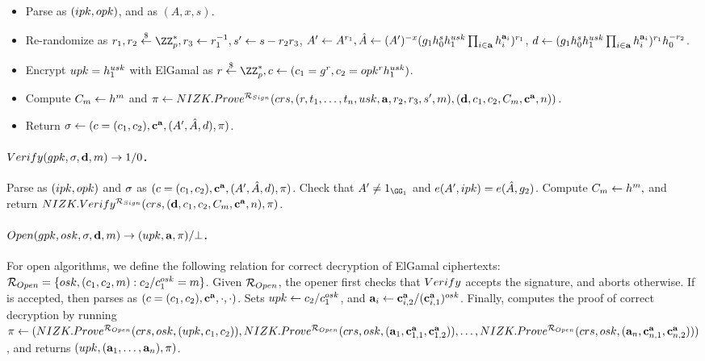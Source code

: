 \begin{itemize}
\item Parse \gpk as $(ipk,opk)$, and \cred as $(A,x,s)$.
\item Re-randomize \cred as $r_1,r_2 \getr
  \ZZ^*_p, r_3 \gets r_1^{-1}, s' \gets s - r_2r_3$, $A' \gets A^{r_1},
  \hat{A} \gets (A')^{-x}(g_1h_0^sh_1^{usk}
  \prod_{i \in \mathbf{a}}h_i^{\mathbf{a}_i})^{r_1}$,
  $d \gets (g_1h_0^sh_1^{usk}
  \prod_{i \in \mathbf{a}}h_i^{\mathbf{a}_i})^{r_1}h_0^{-r_2}$.
\item Encrypt $upk=h_1^{usk}$ with ElGamal as $r \getr \ZZ^*_p,
  c \gets (c_1 = \gen{g}^r,c_2 = \opk^r\gen{h}_1^{\usk})$.
\item Compute $C_{m} \gets h^m$ and
  $\pi \gets NIZK.Prove^{\mathcal{R}_{Sign}}(crs,
  (r,t_1,\dots,t_n,usk,\mathbf{a},r_2,r_3,s',m), (\mathbf{d},c_1,c_2,C_{m},
  \mathbf{c}^{\mathbf{a}},n))$.
\item Return $\sigma \gets (c=(c_1,c_2),\mathbf{c}^{\mathbf{a}},(A',\hat{A},d),\pi)$.
\end{itemize}

\paragraph{$Verify(gpk,\sigma,\mathbf{d},m) \rightarrow 1/0$.} %
Parse \gpk as $(ipk,opk)$ and $\sigma$ as $(c=(c_1,c_2),\mathbf{c}^{\mathbf{a}},
(A',\hat{A},d), \pi)$. Check that $A' \neq 1_{\GG_1}$ and $e(A',ipk) =
e(\hat{A},g_2)$. Compute $C_{m} \gets h^m,$ and return
$NIZK.Verify^{\mathcal{R}_{Sign}}(crs,(\mathbf{d},c_1,c_2,C_{m},\mathbf{c}^{\mathbf{a}},
n),\pi)$.

\paragraph{$Open(gpk,osk,\sigma,\mathbf{d},m)
  \rightarrow (upk,\mathbf{a},\pi)/\bot$.} %
For open algorithms, we define the following relation for correct decryption of
ElGamal ciphertexts: $\mathcal{R}_{Open} = \lbrace osk,(c_1,c_2,m):
c_2/c_1^{osk} = m \rbrace$. Given $\mathcal{R}_{Open}$, the opener first
checks that $Verify$ accepts the signature, and aborts otherwise. If \sig
is accepted, then parses \sig as $(c=(c_1,c_2),\mathbf{c}^{\mathbf{a}},\cdot,\cdot)$.
Sets $upk \gets c_2/c_1^{osk}$, and
$\mathbf{a}_i \gets \mathbf{c}^{\mathbf{a}}_{i,2}/(\mathbf{c}^{\mathbf{a}}_{i,1})^{osk}$. Finally,
computes the proof of correct decryption by running $\pi \gets
(NIZK.Prove^{\mathcal{R}_{Open}}(crs,osk,(upk,c_1,c_2)),
NIZK.Prove^{\mathcal{R}_{Open}}(crs,osk,(\mathbf{a}_1,\mathbf{c}^{\mathbf{a}}_{1,1},\mathbf{c}^{\mathbf{a}}_{1,2})),
\dots,
NIZK.Prove^{\mathcal{R}_{Open}}(crs,osk,(\mathbf{a}_n,\mathbf{c}^{\mathbf{a}}_{n,1},\mathbf{c}^{\mathbf{a}}_{n,2})))$,
and returns $(upk,(\mathbf{a}_1,\dots,\mathbf{a}_n),\pi)$.

